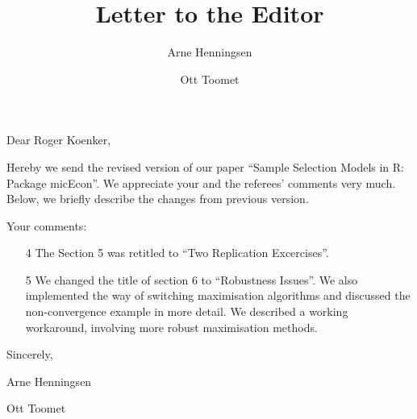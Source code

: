 \documentclass[a4paper]{article}
\title{Letter to the Editor}
\author{Arne Henningsen \and Ott Toomet}
\begin{document}
\maketitle

Dear Roger Koenker,

Hereby we send the revised version of our paper ``Sample Selection
Models in R: Package micEcon''.  We appreciate your and the referees'
comments very much.  Below, we briefly describe the changes from
previous version.

Your comments:

\begin{itemize}
\item[4] The Section 5 was retitled to ``Two Replication Excercises''.
\item[5] We changed the title of section 6 to ``Robustness Issues''.
  We also implemented the way of switching maximisation algorithms and
  discussed the non-convergence example in more detail.  We described
  a working workaround, involving more robust maximisation methods.
\end{itemize}

Sincerely,

Arne Henningsen

Ott Toomet



\end{document}
